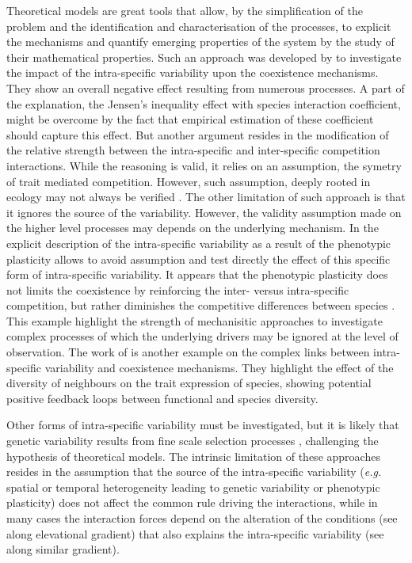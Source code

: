 Theoretical models are great tools that allow, by the simplification of the problem and the identification and characterisation of the processes, to explicit the mechanisms and quantify emerging properties of the system by the study of their mathematical properties. Such an approach was developed by \cite{hart_how_2016} to investigate the impact of the intra-specific variability upon the coexistence mechanisms. They show an overall negative effect resulting from numerous processes. A part of the explanation, the Jensen's inequality effect with species interaction coefficient, might be overcome by the fact that empirical estimation of these coefficient should capture this effect. But another argument resides in the modification of the relative strength between the intra-specific and inter-specific competition interactions. While the reasoning is valid, it relies on an assumption, the symetry of trait mediated competition. However, such assumption, deeply rooted in ecology \parencite{macarthur_limiting_1967} may not always be verified  \parencite{kunstler_plant_2016}. The other limitation of such approach is that it ignores the source of the variability. However, the validity assumption made on the higher level processes may depends on the underlying mechanism. In \model the explicit description of the intra-specific variability as a result of the phenotypic plasticity allows to avoid assumption and test directly the effect of this specific form of intra-specific variability. It appears that the phenotypic plasticity does not limits the coexistence by reinforcing the inter- versus intra-specific competition, but rather diminishes the competitive differences between species . This example highlight the strength of mechanisitic approaches to investigate complex processes of which the underlying drivers may be ignored at the level of observation. The work of \cite{zuppinger-dingley_selection_2014} is another example on the complex links between intra-specific variability and coexistence mechanisms. They highlight the effect of the diversity of neighbours on the trait expression of species, showing potential positive feedback loops between functional and species diversity.

Other forms of intra-specific variability must be investigated, but it is likely that genetic variability results from fine scale selection processes \cite{hamann_evidence_2016}, challenging the hypothesis of theoretical models. The intrinsic limitation of these approaches resides in the assumption that the source of the intra-specific variability (\textit{e.g.} spatial or temporal heterogeneity leading to genetic variability or phenotypic plasticity) does not affect the common rule driving the interactions, while in many cases the interaction forces depend on the alteration of the conditions (see \cite{choler_facilitation_2001} along elevational gradient) that also explains the intra-specific variability (see \cite{kichenin_contrasting_2013} along similar gradient).

